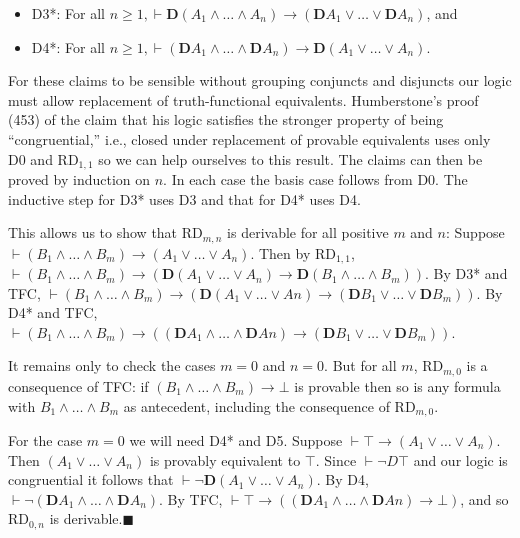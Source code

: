 \begin{itemize}[label={}]
\item{D3*: For all $n{\ge}1, \vdash \mathbf{D}(A_1\wedge {\ldots}\wedge A_n) \rightarrow (\mathbf{D}A_1\vee {\ldots}\vee \mathbf{D}A_n)$, and}
\item{D4*: For all $n{\ge}1, \vdash (\mathbf{D}A_1\wedge {\ldots}\wedge \mathbf{D}A_n) \rightarrow \mathbf{D}(A_1\vee {\ldots}\vee A_n)$.}
\end{itemize}
For these claims to be sensible without grouping conjuncts and disjuncts our logic must allow replacement of truth-functional equivalents. Humberstone's proof (453) of the claim that his logic satisfies the stronger property of being ``congruential,'' i.e., closed under replacement of provable equivalents uses only D0 and RD$_{1,1}$ so we can help ourselves to this result. The claims can then be proved by induction on $n$. In each case the basis case follows from D0. The inductive step for D3* uses D3 and that for D4* uses D4.

This allows us to show that RD$_{m,n}$ is derivable for all positive $m$ and $n$: 
Suppose $\vdash (B_1 \wedge {\ldots}\wedge B_m) \rightarrow (A_1\vee {\ldots}\vee A_n)$. 
Then by RD$_{1,1}$,\\ $\vdash (B_1 \wedge {\ldots}\wedge B_m) \rightarrow (\mathbf{D}(A_1\vee {\ldots}\vee A_n) \rightarrow \mathbf{D}(B_1 \wedge {\ldots}\wedge B_m))$. 
By D3* and TFC, $\vdash (B_1 \wedge {\ldots}\wedge B_m) \rightarrow (\mathbf{D}(A_1\vee {\ldots}\vee An) \rightarrow (\mathbf{D}B_1 \vee {\ldots}\vee \mathbf{D}B_m))$. 
By D4* and TFC, $\vdash (B_1 \wedge {\ldots}\wedge B_m) \rightarrow ((\mathbf{D}A_1\wedge {\ldots}\wedge \mathbf{D}An) \rightarrow (\mathbf{D}B_1 \vee {\ldots}\vee \mathbf{D}B_m))$.

It remains only to check the cases $m{=}0$ and $n{=}0$. But for all $m$, RD$_{m,0}$ is a consequence of TFC: if $(B_1\wedge {\ldots}\wedge B_m)\rightarrow \bot$ is provable then so is any formula with $B_1\wedge {\ldots}\wedge B_m$ as antecedent, including the consequence of RD$_{m,0}$.

For the case $m=0$ we will need D4* and D5. Suppose $\vdash \top \rightarrow (A_1\vee {\ldots}\vee A_n)$. Then $(A_1\vee {\ldots}\vee A_n)$ is provably equivalent to $\top $. Since $\vdash \neg D\top $ and our logic is congruential it follows that
$\vdash \neg \mathbf{D}(A_1\vee {\ldots}\vee A_n)$. By D4, $\vdash \neg (\mathbf{D}A_1\wedge {\ldots}\wedge \mathbf{D}A_n)$. By TFC, $\vdash \top \rightarrow ( (\mathbf{D}A_1\wedge {\ldots}\wedge \mathbf{D}An) \rightarrow \bot)$, and so RD$_{0,n}$ is derivable.$\blacksquare$

